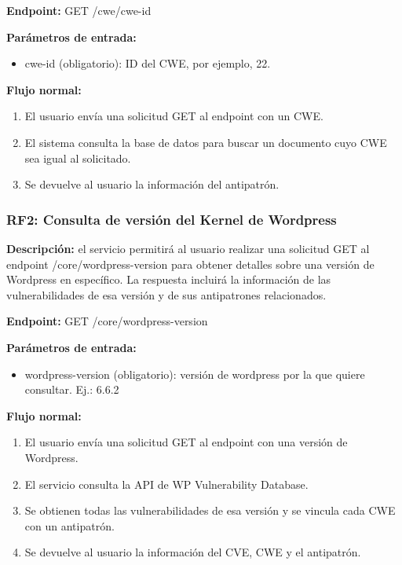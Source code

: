 \textbf{Endpoint:} GET /cwe/{cwe-id}

\textbf{Parámetros de entrada:} 
\begin{itemize}
    \item cwe-id (obligatorio): ID del CWE, por ejemplo, 22.
\end{itemize}

\textbf{Flujo normal:}

\begin{enumerate}
    \item El usuario envía una solicitud GET al endpoint con un CWE.
    \item El sistema consulta la base de datos para buscar un documento cuyo CWE sea igual al solicitado.
    \item Se devuelve al usuario la información del antipatrón.
\end{enumerate}

\subsubsection{RF2: Consulta de versión del Kernel de Wordpress}

\textbf{Descripción:} el servicio permitirá al usuario realizar una solicitud GET al endpoint /core/{wordpress-version} para obtener detalles sobre una versión de Wordpress en específico. La respuesta incluirá la información de las vulnerabilidades de esa versión y de sus antipatrones relacionados.

\textbf{Endpoint:} GET /core/{wordpress-version}

\textbf{Parámetros de entrada:}

\begin{itemize}
    \item wordpress-version (obligatorio): versión de wordpress por la que quiere consultar. Ej.: 6.6.2
\end{itemize}


\textbf{Flujo normal:}

\begin{enumerate}
    \item El usuario envía una solicitud GET al endpoint con una versión de Wordpress.
    \item El servicio consulta la API de WP Vulnerability Database.
    \item Se obtienen todas las vulnerabilidades de esa versión y se vincula cada CWE con un antipatrón.
    \item Se devuelve al usuario la información del CVE, CWE y el antipatrón.
\end{enumerate}

